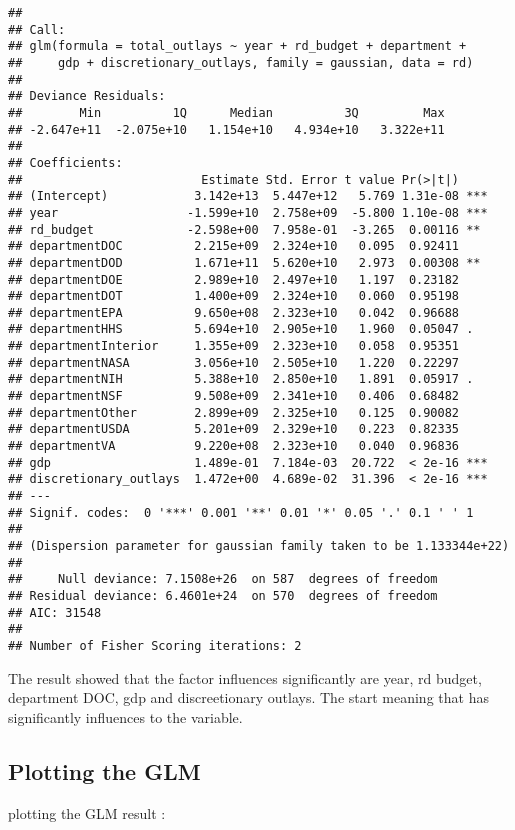 \documentclass[]{article}
\begin{document}
\begin{verbatim}
## 
## Call:
## glm(formula = total_outlays ~ year + rd_budget + department + 
##     gdp + discretionary_outlays, family = gaussian, data = rd)
## 
## Deviance Residuals: 
##        Min          1Q      Median          3Q         Max  
## -2.647e+11  -2.075e+10   1.154e+10   4.934e+10   3.322e+11  
## 
## Coefficients:
##                         Estimate Std. Error t value Pr(>|t|)    
## (Intercept)            3.142e+13  5.447e+12   5.769 1.31e-08 ***
## year                  -1.599e+10  2.758e+09  -5.800 1.10e-08 ***
## rd_budget             -2.598e+00  7.958e-01  -3.265  0.00116 ** 
## departmentDOC          2.215e+09  2.324e+10   0.095  0.92411    
## departmentDOD          1.671e+11  5.620e+10   2.973  0.00308 ** 
## departmentDOE          2.989e+10  2.497e+10   1.197  0.23182    
## departmentDOT          1.400e+09  2.324e+10   0.060  0.95198    
## departmentEPA          9.650e+08  2.323e+10   0.042  0.96688    
## departmentHHS          5.694e+10  2.905e+10   1.960  0.05047 .  
## departmentInterior     1.355e+09  2.323e+10   0.058  0.95351    
## departmentNASA         3.056e+10  2.505e+10   1.220  0.22297    
## departmentNIH          5.388e+10  2.850e+10   1.891  0.05917 .  
## departmentNSF          9.508e+09  2.341e+10   0.406  0.68482    
## departmentOther        2.899e+09  2.325e+10   0.125  0.90082    
## departmentUSDA         5.201e+09  2.329e+10   0.223  0.82335    
## departmentVA           9.220e+08  2.323e+10   0.040  0.96836    
## gdp                    1.489e-01  7.184e-03  20.722  < 2e-16 ***
## discretionary_outlays  1.472e+00  4.689e-02  31.396  < 2e-16 ***
## ---
## Signif. codes:  0 '***' 0.001 '**' 0.01 '*' 0.05 '.' 0.1 ' ' 1
## 
## (Dispersion parameter for gaussian family taken to be 1.133344e+22)
## 
##     Null deviance: 7.1508e+26  on 587  degrees of freedom
## Residual deviance: 6.4601e+24  on 570  degrees of freedom
## AIC: 31548
## 
## Number of Fisher Scoring iterations: 2
\end{verbatim}

The result showed that the factor influences significantly are year, rd
budget, department DOC, gdp and discreetionary outlays. The start
meaning that has significantly influences to the variable.

\subsection{Plotting the GLM}\label{plotting-the-glm}

plotting the GLM result :
\end{document}
